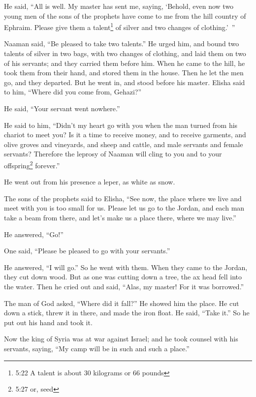 \myverse{}He said, “All is well. My master has sent me, saying, ‘Behold,
even now two young men of the sons of the prophets have come to me from the hill country of Ephraim. Please
give them a talent\footnote{5:22 A talent is about 30 kilograms or 66 pounds} of silver and two changes of clothing.’ ”

\myverse{}Naaman said, “Be pleased to take two talents.” He urged him,
and bound two talents of silver in two bags, with two changes of clothing, and laid them on two of his
servants; and they carried them before him.
\myverse{}When he came to the hill, he took them from their hand, and stored them in
the house. Then he let the men go, and they departed.
\myverse{}But he went in, and stood before his master. Elisha said to him, “Where did
you come from, Gehazi?”

He said, “Your servant went nowhere.”

\myverse{}He said to him, “Didn’t my heart go with you when the man turned
from his chariot to meet you? Is it a time to receive money, and to receive garments, and olive groves
and vineyards, and sheep and cattle, and male servants and female servants?
\myverse{}Therefore the leprosy of Naaman will cling to you and to your offspring\footnote{5:27 or, seed} forever.”

He went out from his presence a leper, as white as snow.


\mychapter{} \myverse*{}The sons of the prophets said to Elisha, “See now, the place where
we live and meet with you is too small for us.
\myverse{}Please let us go to the Jordan, and each man take a beam from there, and let’s
make us a place there, where we may live.”

He answered, “Go!”

\myverse{}One said, “Please be pleased to go with your servants.”

He answered, “I will go.”
\myverse{}So he went with them. When they came to the Jordan, they cut down wood.
\myverse{}But as one was cutting down a tree, the ax head fell into the water. Then he
cried out and said, “Alas, my master! For it was borrowed.”

\myverse{}The man of God asked, “Where did it fall?” He showed him the place.
He cut down a stick, threw it in there, and made the iron float.
\myverse{}He said, “Take it.” So he put out his hand and took it.

\myverse{}Now the king of Syria was at war against Israel; and he took counsel
with his servants, saying, “My camp will be in such and such a place.”

